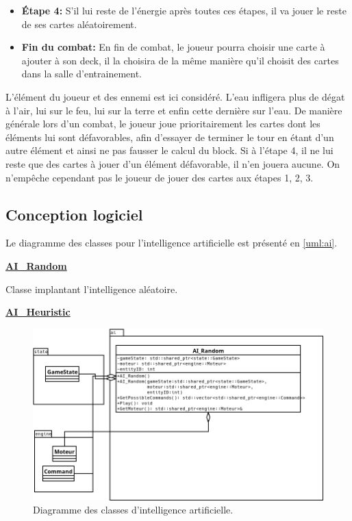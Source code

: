\begin{itemize}
\begin{itemize}
                \item \textbf{\'Etape 4:} S'il lui reste de l'énergie après toutes ces étapes, il va jouer le reste de ses cartes aléatoirement.
                \item \textbf{Fin du combat:} En fin de combat, le joueur pourra choisir une carte à ajouter à son deck, il la choisira de la m\^eme manière qu'il choisit des cartes dans la salle d'entrainement.
            \end{itemize}
            L'élément du joueur et des ennemi est ici considéré. L'eau infligera plus de dégat à l'air, lui sur le feu, lui sur la terre et enfin cette dernière sur l'eau. De manière générale lors d'un combat, le joueur joue prioritairement les cartes dont les éléments lui sont défavorables, afin d'essayer de terminer le tour en étant d'un autre élément et ainsi ne pas fausser le calcul du block. Si à l'étape 4, il ne lui reste que des cartes à jouer d'un élément défavorable, il n'en jouera aucune. On n'empêche cependant pas le joueur de jouer des cartes aux étapes 1, 2, 3.
        \end{itemize}
    \clearpage
    
\subsection{Conception logiciel}
    Le diagramme des classes pour l’intelligence artificielle est présenté en \autoref{uml:ai}.
    
    \underline{\textbf{AI\_Random}}
    \par Classe implantant l'intelligence aléatoire.
    
    \underline{\textbf{AI\_Heuristic}}
    
    \clearpage
    
    \begin{figure}[hp]
    \includegraphics[width=0.6\paperheight]{images/ai.png}
    \caption{\label{uml:ai}Diagramme des classes d'intelligence artificielle.} 
    \end{figure}
    
    \clearpage

